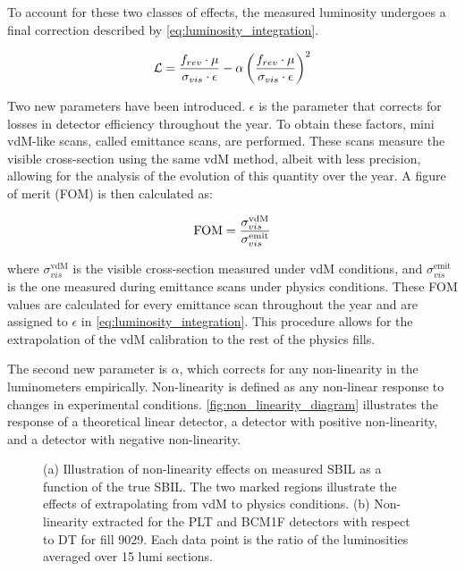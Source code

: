 To account for these two classes of effects, the measured luminosity undergoes a final correction described by \autoref{eq:luminosity_integration}.

\begin{equation}
    \centering
    \mathcal{L} = \frac{f_{rev} \cdot \mu}{\sigma_{vis} \cdot \epsilon} - \alpha \left( \frac{f_{rev} \cdot \mu}{\sigma_{vis} \cdot \epsilon} \right)^{2}
    \label{eq:luminosity_integration}
\end{equation}

Two new parameters have been introduced. \(\epsilon\) is the parameter that corrects for losses in detector efficiency throughout the year. To obtain these factors, mini vdM-like scans, called emittance scans, are performed. These scans measure the visible cross-section using the same vdM method, albeit with less precision, allowing for the analysis of the evolution of this quantity over the year. A figure of merit (FOM) is then calculated as:

\begin{equation}
    \centering
    \text{FOM} = \frac{\sigma^{\text{vdM}}_{vis}}{\sigma^{\text{emit}}_{vis}}
    \label{eq:figure_of_merit}
\end{equation}

where \(\sigma^{\text{vdM}}_{vis}\) is the visible cross-section measured under vdM conditions, and \(\sigma^{\text{emit}}_{vis}\) is the one measured during emittance scans under physics conditions. These FOM values are calculated for every emittance scan throughout the year and are assigned to \(\epsilon\) in \autoref{eq:luminosity_integration}. This procedure allows for the extrapolation of the vdM calibration to the rest of the physics fills.

The second new parameter is \(\alpha\), which corrects for any non-linearity in the luminometers empirically. Non-linearity is defined as any non-linear response to changes in experimental conditions. \autoref{fig:non_linearity_diagram} illustrates the response of a theoretical linear detector, a detector with positive non-linearity, and a detector with negative non-linearity.

\begin{figure}[h]
	\centering
	\caption{(a) Illustration of non-linearity effects on measured SBIL as a function of the true SBIL. The two marked regions illustrate the effects of extrapolating from vdM to physics conditions. (b) Non-linearity extracted for the PLT and BCM1F detectors with respect to DT for fill 9029. Each data point is the ratio of the luminosities averaged over 15 lumi sections.}
\end{figure}

